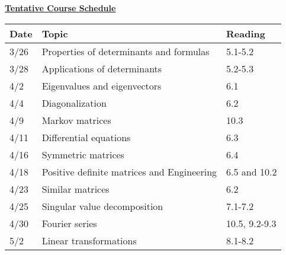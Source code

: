\documentclass[11pt, a4paper]{article}
\begin{document}
\centerline{\Large \underline{\textbf{Tentative Course Schedule}}}
\vspace{5pt}
\small
\begin{tabular}{ |p{0.5in}|p{4.0in}|p{1.0in}| }
\hline
  \textbf{Date} & \textbf{Topic} & \textbf{Reading}  \\ \hline
 3/26 & Properties of determinants and formulas &  5.1-5.2 \\ \hline
3/28 & Applications of determinants &  5.2-5.3 \\ \hline
4/2 & Eigenvalues and eigenvectors &  6.1 \\ \hline
4/4 & Diagonalization &  6.2 \\ \hline
4/9 & Markov matrices &  10.3 \\ \hline
4/11 & Differential equations &  6.3 \\ \hline
4/16 & Symmetric matrices &  6.4 \\ \hline
4/18 & Positive definite matrices and Engineering &  6.5 and 10.2 \\ \hline
4/23 & Similar matrices &  6.2 \\ \hline
4/25 & Singular value decomposition &  7.1-7.2 \\ \hline
4/30 & Fourier series &  10.5, 9.2-9.3 \\ \hline
5/2 & Linear transformations &  8.1-8.2 \\ \hline
\end{tabular}

\end{document}

